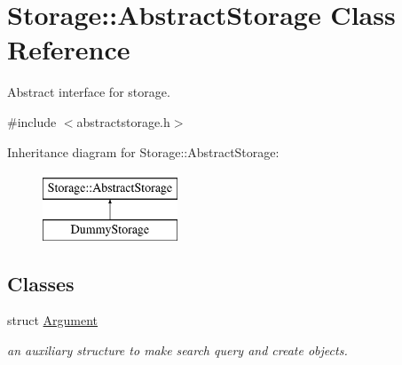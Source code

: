 \hypertarget{classStorage_1_1AbstractStorage}{
\section{Storage::AbstractStorage Class Reference}
\label{d6/da0/classStorage_1_1AbstractStorage}
}


Abstract interface for storage.  




{\ttfamily \#include $<$abstractstorage.h$>$}

Inheritance diagram for Storage::AbstractStorage:\begin{figure}[H]
\begin{center}
\leavevmode
\includegraphics[height=2.000000cm]{d6/da0/classStorage_1_1AbstractStorage}
\end{center}
\end{figure}
\subsection*{Classes}
\begin{DoxyCompactItemize}
\item 
struct \hyperlink{structStorage_1_1AbstractStorage_1_1Argument}{Argument}
\begin{DoxyCompactList}\small\item\em an auxiliary structure to make search query and create objects. \item\end{DoxyCompactList}\end{DoxyCompactItemize}

